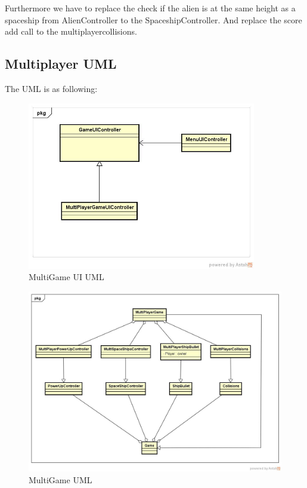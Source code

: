 \documentclass[10pt]{article}
\begin{document}
Furthermore we have to replace the check if the alien is at the same height as a spaceship from AlienController to the SpaceshipController. \newline
And replace the score add call to the multiplayercollisions.
\newpage
\subsection{Multiplayer UML}
The UML is as following:
\begin{figure}[ht!]
	\centering
	\includegraphics[width=10cm]{GameUI.jpg}
	\caption{MultiGame UI UML}
	\label{fig:1-1MultiGameUI}
\end{figure}
\begin{figure}[ht!]
	\centering
	\includegraphics[width=15cm]{MultiGame.jpg}
	\caption{MultiGame UML}
	\label{fig:1-1MultiGameGame}
\end{figure}
\end{document}
